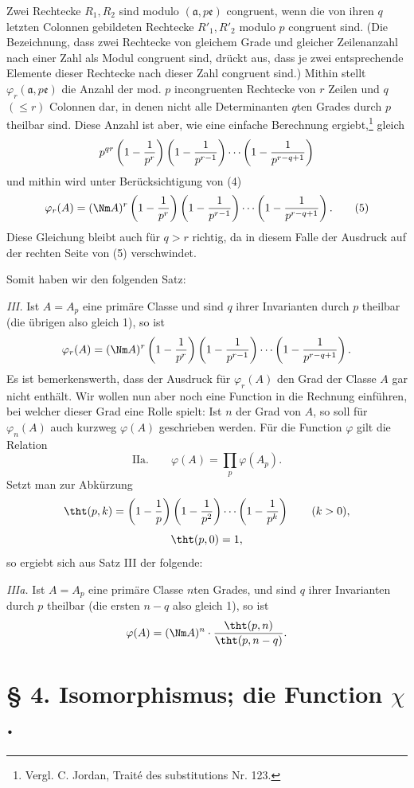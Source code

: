 Zwei Rechtecke $R_1,R_2$ sind modulo $(\mathfrak a,p\mathfrak e)$ congruent, wenn die von ihren $q$ letzten Colonnen gebildeten Rechtecke $R'_1,R'_2$ modulo $p$ congruent sind. (Die Bezeichnung, dass zwei Rechtecke von gleichem Grade und gleicher Zeilenanzahl nach einer Zahl als Modul congruent sind, drückt aus, dass je zwei entsprechende Elemente dieser Rechtecke nach dieser Zahl congruent sind.) Mithin stellt $\varphi_r(\mathfrak a,p\mathfrak e)$ die Anzahl der mod. $p$ incongruenten Rechtecke von $r$ Zeilen und $q$ $(\le r)$ Colonnen dar, in denen nicht alle Determinanten $q$ten Grades durch $p$ theilbar sind. Diese Anzahl ist aber, wie eine einfache Berechnung ergiebt,\footnote{Vergl. C. Jordan, Traité des substitutions Nr. 123.} gleich
\[
 p^{qr}\left(1-{1\over p^r}\right)
 \left(1-{1\over p^{r-1}}\right)
 \cdots
 \left(1-{1\over p^{r-q+1}}\right)
\]
und mithin wird unter Berücksichtigung von (4)
\begin{equation}
 \varphi_r(A)=(\Nm A)^r
 \left(1-{1\over p^r}\right)
 \left(1-{1\over p^{r-1}}\right)
 \cdots
 \left(1-{1\over p^{r-q+1}}\right).
\tag{5}
\end{equation}
Diese Gleichung bleibt auch für $q>r$ richtig, da in diesem Falle der Ausdruck auf der rechten Seite von (5) verschwindet.

Somit haben wir den folgenden Satz:

\emph{III.} Ist $A=A_p$ eine primäre Classe und sind $q$ ihrer Invarianten durch $p$ theilbar (die übrigen also gleich 1), so ist
\[
 \varphi_r(A)=(\Nm A)^r
 \left(1-{1\over p^r}\right)
 \left(1-{1\over p^{r-1}}\right)
 \cdots
 \left(1-{1\over p^{r-q+1}}\right).
\]
Es ist bemerkenswerth, dass der Ausdruck für $\varphi_r(A)$ den Grad der Classe $A$ gar nicht enthält. Wir wollen nun aber noch eine Function in die Rechnung einführen, bei welcher dieser Grad eine Rolle spielt: Ist $n$ der Grad von $A$, so soll für $\varphi_n(A)$ auch kurzweg $\varphi(A)$ geschrieben werden. Für die Function $\varphi$ gilt die Relation
\[
\text{IIa.}\qquad
 \varphi(A)=\prod_p \varphi(A_p).
\]
Setzt man zur Abkürzung
\[
 \tht(p,k)=\left(1-{1\over p}\right)
 \left(1-{1\over p^2}\right)\cdots
 \left(1-{1\over p^k}\right)\qquad (k>0),
\]
\[
 \tht(p,0)=1,
\]
so ergiebt sich aus Satz III der folgende:

\emph{IIIa.} Ist $A=A_p$ eine primäre Classe $n$ten Grades, und sind $q$ ihrer Invarianten durch $p$ theilbar (die ersten $n-q$ also gleich 1), so ist
\[
 \varphi(A)=(\Nm A)^n\cdot {\tht(p,n)\over \tht(p,n-q)}.
\]


\section*{§ 4. Isomorphismus; die Function $\chi$.}

